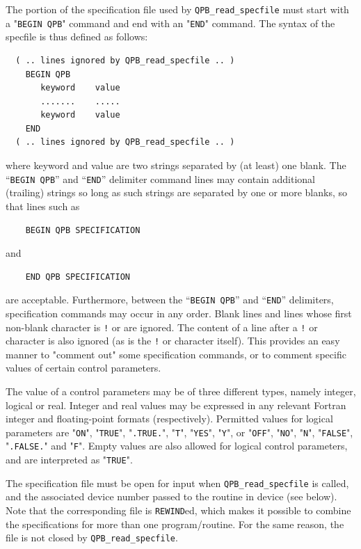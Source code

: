 \documentclass{galahad}
\newcommand{\packagename}{QPB}
\begin{document}
The portion of the specification file used by 
{\tt \packagename\_read\_specfile}
must start
with a "{\tt BEGIN \packagename}" command and end with an 
"{\tt END}" command.  The syntax of the specfile is thus defined as follows:
\begin{verbatim}
  ( .. lines ignored by QPB_read_specfile .. )
    BEGIN QPB
       keyword    value
       .......    .....
       keyword    value
    END 
  ( .. lines ignored by QPB_read_specfile .. )
\end{verbatim}
where keyword and value are two strings separated by (at least) one blank.
The ``{\tt BEGIN \packagename}'' and ``{\tt END}'' delimiter command lines 
may contain additional (trailing) strings so long as such strings are 
separated by one or more blanks, so that lines such as
\begin{verbatim}
    BEGIN QPB SPECIFICATION
\end{verbatim}
and
\begin{verbatim}
    END QPB SPECIFICATION
\end{verbatim}
are acceptable. Furthermore, 
between the
``{\tt BEGIN \packagename}'' and ``{\tt END}'' delimiters,
specification commands may occur in any order.  Blank lines and
lines whose first non-blank character is {\tt !} or {\tt *} are ignored. 
The content 
of a line after a {\tt !} or {\tt *} character is also 
ignored (as is the {\tt !} or {\tt *}
character itself). This provides an easy manner to "comment out" some 
specification commands, or to comment specific values 
of certain control parameters.  

The value of a control parameters may be of three different types, namely
integer, logical or real.
Integer and real values may be expressed in any relevant Fortran integer and
floating-point formats (respectively). Permitted values for logical
parameters are "{\tt ON}", "{\tt TRUE}", "{\tt .TRUE.}", "{\tt T}", 
"{\tt YES}", "{\tt Y}", or "{\tt OFF}", "{\tt NO}",
"{\tt N}", "{\tt FALSE}", "{\tt .FALSE.}" and "{\tt F}". 
Empty values are also allowed for 
logical control parameters, and are interpreted as "{\tt TRUE}".  

The specification file must be open for 
input when {\tt \packagename\_read\_specfile}
is called, and the associated device number 
passed to the routine in device (see below). 
Note that the corresponding 
file is {\tt REWIND}ed, which makes it possible to combine the specifications 
for more than one program/routine.  For the same reason, the file is not
closed by {\tt \packagename\_read\_specfile}.
\end{document}
